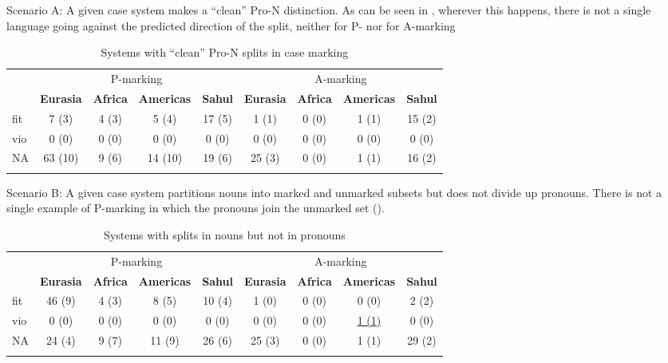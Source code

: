 \documentclass[output=paper]{langscibook}
\begin{document}
Scenario A: A given case system makes a “clean” Pro-N distinction. As can be seen in , wherever this happens, there is not a single language going against the predicted direction of the split, neither for P- nor for A-marking

\begin{table}
\caption{Systems with “clean” Pro-N splits in case marking}
\label{18-sc-tab:4}
\begin{tabularx}{\textwidth}{Xcccccccc} 
\lsptoprule
& \multicolumn{4}{c}{P-marking} & \multicolumn{4}{c}{A-marking}\\

& \bfseries Eurasia & \bfseries Africa & \bfseries Americas & \bfseries Sahul   & \bfseries Eurasia & \bfseries Africa & \bfseries Americas & \bfseries Sahul\\
\midrule
fit & 7 (3) & 4 (3) & 5 (4) & 17 (5)  & 1 (1) & 0 (0) & 1 (1) & 15 (2)\\
vio & 0 (0) & 0 (0) & 0 (0) & 0 (0) &  0 (0) & 0 (0) & 0 (0) & 0 (0)\\
NA & 63 (10) & 9 (6) & 14 (10) & 19 (6) & 25 (3) & 0 (0) & 1 (1) & 16 (2)\\
\lspbottomrule
\end{tabularx}
\end{table}

\newpage 
Scenario B: A given case system partitions nouns into marked and unmarked subsets but does not divide up pronouns. There is not a single example of P-marking in which the pronouns join the unmarked set ().

\begin{table}
\caption{Systems with splits in nouns but not in pronouns}
\label{18-sc-tab:5}
\begin{tabularx}{\textwidth}{Xcccccccc}
\lsptoprule
& \multicolumn{4}{c}{P-marking} & \multicolumn{4}{c}{A-marking}\\

& \bfseries Eurasia & \bfseries Africa & \bfseries Americas & \bfseries Sahul   & \bfseries Eurasia & \bfseries Africa & \bfseries Americas & \bfseries Sahul\\
\midrule
fit & 46 (9) & 4 (3) & 8 (5) & 10 (4) & 1 (0) & 0 (0) & 0 (0) & 2 (2)\\
vio & 0 (0) & 0 (0) & 0 (0) & 0 (0) &  0 (0) & 0 (0) & \underline{1 (1)}& 0 (0)\\
NA & 24 (4) & 9 (7) & 11 (9) & 26 (6) & 25 (3) & 0 (0) & 1 (1) & 29 (2)\\
\lspbottomrule
\end{tabularx}
\end{table}
\end{document}
